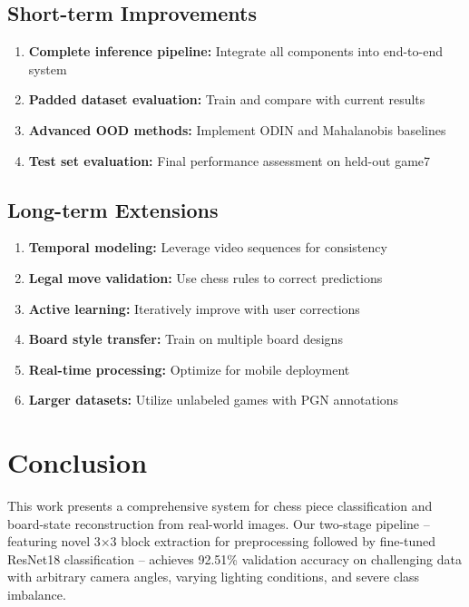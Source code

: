 \documentclass[conference]{IEEEtran}
\begin{document}
\subsection{Short-term Improvements}

\begin{enumerate}
    \item \textbf{Complete inference pipeline:} Integrate all components into end-to-end system
    \item \textbf{Padded dataset evaluation:} Train and compare with current results
    \item \textbf{Advanced OOD methods:} Implement ODIN and Mahalanobis baselines
    \item \textbf{Test set evaluation:} Final performance assessment on held-out game7
\end{enumerate}

\subsection{Long-term Extensions}

\begin{enumerate}
    \item \textbf{Temporal modeling:} Leverage video sequences for consistency
    \item \textbf{Legal move validation:} Use chess rules to correct predictions
    \item \textbf{Active learning:} Iteratively improve with user corrections
    \item \textbf{Board style transfer:} Train on multiple board designs
    \item \textbf{Real-time processing:} Optimize for mobile deployment
    \item \textbf{Larger datasets:} Utilize unlabeled games with PGN annotations
\end{enumerate}

\section{Conclusion}

This work presents a comprehensive system for chess piece classification and board-state reconstruction from real-world images. Our two-stage pipeline -- featuring novel 3×3 block extraction for preprocessing followed by fine-tuned ResNet18 classification -- achieves 92.51\% validation accuracy on challenging data with arbitrary camera angles, varying lighting conditions, and severe class imbalance.
\end{document}
